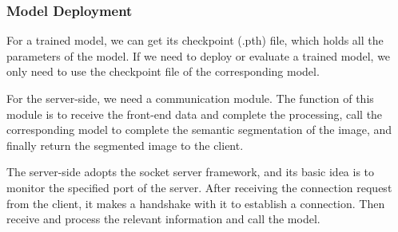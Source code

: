 \subsubsection{Model Deployment}

For a trained model, we can get its checkpoint (.pth) file, which holds all the parameters of the model. If we need to deploy or evaluate a trained model, we only need to use the checkpoint file of the corresponding model.

For the server-side, we need a communication module. The function of this module is to receive the front-end data and complete the processing, call the corresponding model to complete the semantic segmentation of the image, and finally return the segmented image to the client.


The server-side adopts the socket server framework, and its basic idea is to monitor the specified port of the server. After receiving the connection request from the client, it makes a handshake with it to establish a connection. Then receive and process the relevant information and call the model.




